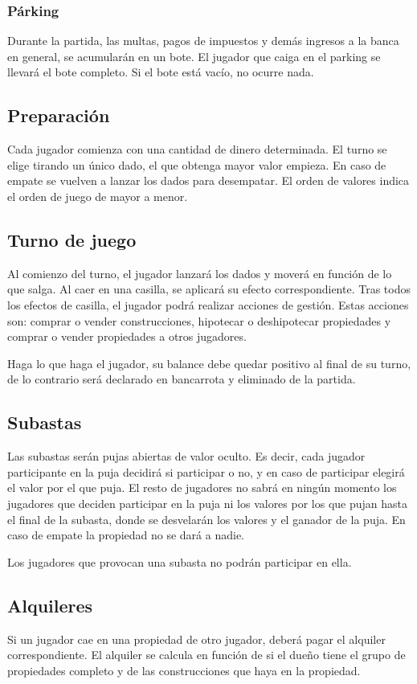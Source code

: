 \subsubsection{Párking}
Durante la partida, las multas, pagos de impuestos y demás ingresos 
a la banca en general,
se acumularán en un bote. El jugador que caiga en el parking se llevará
el bote completo. Si el bote está vacío, no ocurre nada.

\subsection{Preparación}
Cada jugador comienza con una cantidad de dinero determinada.
El turno se elige tirando un único dado, el que obtenga mayor valor empieza.
En caso de empate se vuelven a lanzar los dados para desempatar.
El orden de valores indica el orden de juego
de mayor a menor.


\subsection{Turno de juego}
Al comienzo del turno, el jugador lanzará los dados y moverá en función de lo 
que salga. Al caer en una casilla, se aplicará su efecto correspondiente.
Tras todos los efectos de casilla, el jugador podrá realizar acciones de 
gestión. Estas acciones son: comprar o vender construcciones, hipotecar o 
deshipotecar propiedades y comprar o vender propiedades a otros jugadores.

Haga lo que haga el jugador, su balance debe quedar positivo al final de su turno,
de lo contrario será declarado en bancarrota y eliminado de la partida.

\subsection{Subastas}
Las subastas serán pujas abiertas de valor oculto. Es decir, cada jugador
participante en la puja decidirá si participar o no, y en caso de participar
elegirá el valor por el que puja. El resto de jugadores no sabrá en ningún 
momento los jugadores que deciden participar en la puja ni los valores por los 
que pujan hasta el final de la subasta, donde se desvelarán los valores y 
el ganador de la puja. En caso de empate la propiedad no se dará a nadie.

Los jugadores que provocan una subasta no podrán participar en ella.

\subsection{Alquileres}
Si un jugador cae en una propiedad de otro jugador, deberá pagar el alquiler
correspondiente. El alquiler se calcula en función de si el dueño tiene el grupo 
de propiedades completo y de las construcciones que haya en la propiedad.


